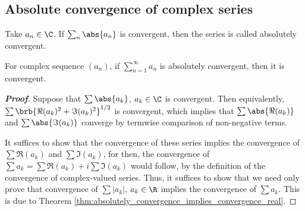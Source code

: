 \subsection{Absolute convergence of complex series}

\begin{definition}
Take $a_n\in\C$. If $\sum_n\abs{a_n}$ is convergent, then the series is called absolutely convergent.
\end{definition}

\begin{theorem}\label{thm:absolutely_convergence_implies_convergence_complex}
For complex sequence $(a_n)$, if $\sum_{n=1}^{\infty} a_n$ is absolutely convergent, then it is convergent.
\end{theorem}

\begin{proof}[{\bf Proof}]
Suppose that $\sum \abs{a_{k}}$, $a_{k}\in \C$ is convergent. Then equivalently, $\sum \brb{\Re(a_{k})^{2}+\Im(a_{k})^{2}}^{1/2}$ is convergent, which implies that $\sum \abs{\Re (a_{k})} $ and $\sum \abs{\Im (a_{k})}$ converge by termwise comparison of non-negative terms.

It suffices to show that the convergence of these series implies the convergence of $\sum \Re(a_{k})$ and $\sum \Im(a_{k})$, for then, the convergence of $\sum a_{k}=\sum \Re(a_{k})+i\sum \Im (a_{k})$ would follow, by the definition of the convergence of complex-valued series. Thus, it suffices to show that we need only prove that convergence of $\sum |a_{k}|$, $a_{k}\in \R$ implies the convergence of $\sum a_{k}$. This is due to Theorem \ref{thm:absolutely_convergence_implies_convergence_real}.
\end{proof}



